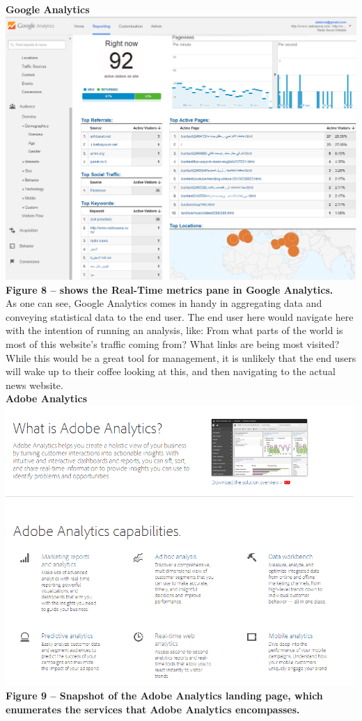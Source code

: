 \documentclass[12pt]{article}
\begin{document}
\noindent\textbf{Google Analytics} \\
\noindent\includegraphics[scale=0.45]{img/google_analytics}
\noindent\textbf{Figure 8 -- shows the Real-Time metrics pane in Google Analytics.} \\

As one can see, Google Analytics comes in handy in aggregating data and conveying statistical data to the end user. The end user here would navigate here with the intention of running an analysis, like: From what parts of the world is most of this website's traffic coming from? What links are being most visited?
While this would be a great tool for management, it is unlikely that the end users will wake up to their coffee looking at this, and then navigating to the actual news website. \\

\noindent\textbf{Adobe Analytics} \\
\noindent\includegraphics[scale=0.6]{img/adobe_analytics}
\noindent\textbf{Figure 9 -- Snapshot of the Adobe Analytics landing page, which enumerates the services that Adobe Analytics encompasses.} \\
\end{document}
